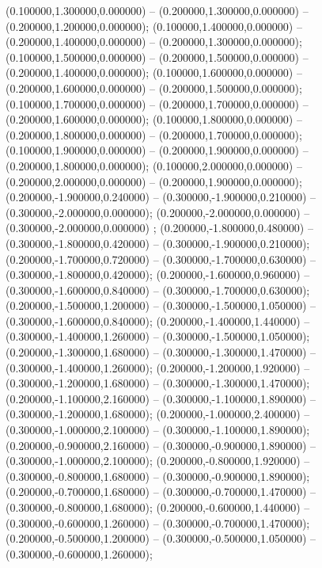 (0.100000,1.300000,0.000000) -- (0.200000,1.300000,0.000000) -- (0.200000,1.200000,0.000000);
 (0.100000,1.400000,0.000000) -- (0.200000,1.400000,0.000000) -- (0.200000,1.300000,0.000000);
 (0.100000,1.500000,0.000000) -- (0.200000,1.500000,0.000000) -- (0.200000,1.400000,0.000000);
 (0.100000,1.600000,0.000000) -- (0.200000,1.600000,0.000000) -- (0.200000,1.500000,0.000000);
 (0.100000,1.700000,0.000000) -- (0.200000,1.700000,0.000000) -- (0.200000,1.600000,0.000000);
 (0.100000,1.800000,0.000000) -- (0.200000,1.800000,0.000000) -- (0.200000,1.700000,0.000000);
 (0.100000,1.900000,0.000000) -- (0.200000,1.900000,0.000000) -- (0.200000,1.800000,0.000000);
 (0.100000,2.000000,0.000000) -- (0.200000,2.000000,0.000000) -- (0.200000,1.900000,0.000000);
 (0.200000,-1.900000,0.240000) -- (0.300000,-1.900000,0.210000) -- (0.300000,-2.000000,0.000000);
 (0.200000,-2.000000,0.000000) -- (0.300000,-2.000000,0.000000) ;
 (0.200000,-1.800000,0.480000) -- (0.300000,-1.800000,0.420000) -- (0.300000,-1.900000,0.210000);
 (0.200000,-1.700000,0.720000) -- (0.300000,-1.700000,0.630000) -- (0.300000,-1.800000,0.420000);
 (0.200000,-1.600000,0.960000) -- (0.300000,-1.600000,0.840000) -- (0.300000,-1.700000,0.630000);
 (0.200000,-1.500000,1.200000) -- (0.300000,-1.500000,1.050000) -- (0.300000,-1.600000,0.840000);
 (0.200000,-1.400000,1.440000) -- (0.300000,-1.400000,1.260000) -- (0.300000,-1.500000,1.050000);
 (0.200000,-1.300000,1.680000) -- (0.300000,-1.300000,1.470000) -- (0.300000,-1.400000,1.260000);
 (0.200000,-1.200000,1.920000) -- (0.300000,-1.200000,1.680000) -- (0.300000,-1.300000,1.470000);
 (0.200000,-1.100000,2.160000) -- (0.300000,-1.100000,1.890000) -- (0.300000,-1.200000,1.680000);
 (0.200000,-1.000000,2.400000) -- (0.300000,-1.000000,2.100000) -- (0.300000,-1.100000,1.890000);
 (0.200000,-0.900000,2.160000) -- (0.300000,-0.900000,1.890000) -- (0.300000,-1.000000,2.100000);
 (0.200000,-0.800000,1.920000) -- (0.300000,-0.800000,1.680000) -- (0.300000,-0.900000,1.890000);
 (0.200000,-0.700000,1.680000) -- (0.300000,-0.700000,1.470000) -- (0.300000,-0.800000,1.680000);
 (0.200000,-0.600000,1.440000) -- (0.300000,-0.600000,1.260000) -- (0.300000,-0.700000,1.470000);
 (0.200000,-0.500000,1.200000) -- (0.300000,-0.500000,1.050000) -- (0.300000,-0.600000,1.260000);
